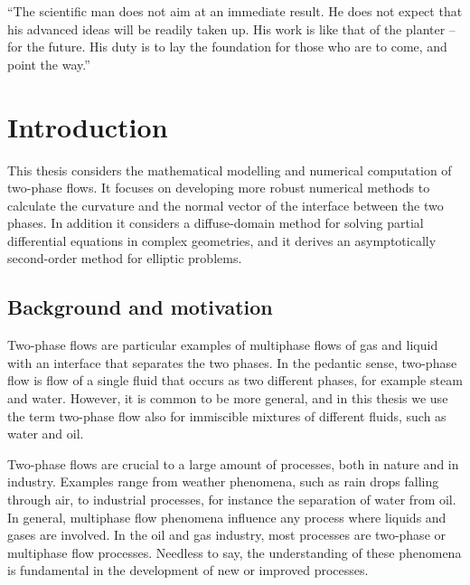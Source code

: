 \documentclass[11pt,b5paper,DIV=calc,BCOR1.3cm,headings=small,%
               footinclude=false,headsepline]{scrbook}
\begin{document}
\tableofcontents

\mainmatter

\begin{savequote}[8.2cm]
  ``The scientific man does not aim at an immediate result.  He does not expect
  that his advanced ideas will be readily taken up.  His work is like that of
  the planter -- for the future.  His duty is to lay the foundation for those
  who are to come, and point the way.''
\end{savequote}
\chapter{Introduction}
This thesis considers the mathematical modelling and numerical computation of
two-phase flows.  It focuses on developing more robust numerical methods to
calculate the curvature and the normal vector of the interface between the two
phases.  In addition it considers a diffuse-domain method for solving partial
differential equations in complex geometries, and it derives an asymptotically
second-order method for elliptic problems.

\section{Background and motivation}
Two-phase flows are particular examples of multiphase flows of gas and liquid
with an interface that separates the two phases.  In the pedantic sense,
two-phase flow is flow of a single fluid that occurs as two different phases,
for example steam and water.  However, it is common to be more general, and in
this thesis we use the term two-phase flow also for immiscible mixtures of
different fluids, such as water and oil.

Two-phase flows are crucial to a large amount of processes, both in nature and
in industry.  Examples range from weather phenomena, such as rain drops falling
through air, to industrial processes, for instance the separation of water from
oil.  In general, multiphase flow phenomena influence any process where liquids
and gases are involved.  In the oil and gas industry, most processes are
two-phase or multiphase flow processes.  Needless to say, the understanding of
these phenomena is fundamental in the development of new or improved processes.
\end{document}
